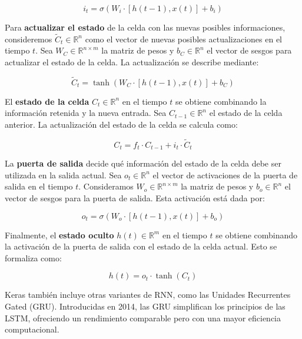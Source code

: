 \begin{equation}
    i_t = \sigma(W_i \cdot [h(t-1), x(t)] + b_i)
\end{equation}

Para \textbf{actualizar el estado} de la celda con las nuevas posibles informaciones, consideremos \( \tilde{C}_t \in \mathbb{R}^n \) como el vector de nuevas posibles actualizaciones en el tiempo \( t \). Sea \( W_C \in \mathbb{R}^{n \times m} \) la matriz de pesos y \( b_C \in \mathbb{R}^n \) el vector de sesgos para actualizar el estado de la celda. La actualización se describe mediante:

\begin{equation}
    \tilde{C}_t = \tanh(W_C \cdot [h(t-1), x(t)] + b_C)
\end{equation}

El \textbf{estado de la celda} \( C_t \in \mathbb{R}^n \) en el tiempo \( t \) se obtiene combinando la información retenida y la nueva entrada. Sea \( C_{t-1} \in \mathbb{R}^n \) el estado de la celda anterior. La actualización del estado de la celda se calcula como:

\begin{equation}
    C_t = f_t \cdot C_{t-1} + i_t \cdot \tilde{C}_t
\end{equation}

La \textbf{puerta de salida} decide qué información del estado de la celda debe ser utilizada en la salida actual. Sea \( o_t \in \mathbb{R}^n \) el vector de activaciones de la puerta de salida en el tiempo \( t \). Consideramos \( W_o \in \mathbb{R}^{n \times m} \) la matriz de pesos y \( b_o \in \mathbb{R}^n \) el vector de sesgos para la puerta de salida. Esta activación está dada por:

\begin{equation}
    o_t = \sigma(W_o \cdot [h(t-1), x(t)] + b_o)
\end{equation}

Finalmente, el \textbf{estado oculto} \( h(t) \in \mathbb{R}^m \) en el tiempo \( t \) se obtiene combinando la activación de la puerta de salida con el estado de la celda actual. Esto se formaliza como:

\begin{equation}
    h(t) = o_t \cdot \tanh(C_t)
\end{equation}

Keras también incluye otras variantes de RNN, como las Unidades Recurrentes Gated (GRU). Introducidas en 2014, las GRU simplifican los principios de las LSTM, ofreciendo un rendimiento comparable pero con una mayor eficiencia computacional.



